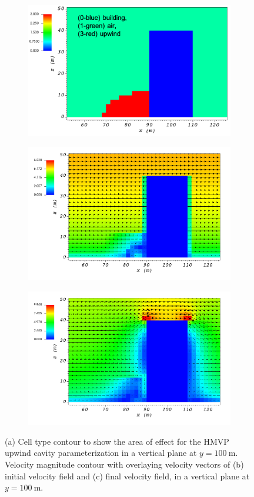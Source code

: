 \begin{figure}[H]
    \centering
    \begin{subfigure}{\textwidth}
    \centering
    \includegraphics[width=10.3cm,keepaspectratio]{Images/upwind_y_100_3_init_icell.png}
    \caption{}
    \end{subfigure}
    \begin{subfigure}{\textwidth}
    \centering
    \includegraphics[width=11.0cm,keepaspectratio]{Images/upwind_y_100_3_init_vel.png}
    \caption{}
    \end{subfigure}
    \begin{subfigure}{\textwidth}
    \centering
    \includegraphics[width=11.0cm,keepaspectratio]{Images/upwind_y_100_3_final.png}
    \caption{}
    \end{subfigure}
    \caption{(a) Cell type contour to show the area of effect for the HMVP upwind cavity parameterization in a vertical plane at $y=100\ \si{\meter}$. Velocity magnitude contour with overlaying velocity vectors of (b) initial velocity field and (c) final velocity field, in a vertical plane at $y=100\ \si{\meter}$.}
\end{figure}

